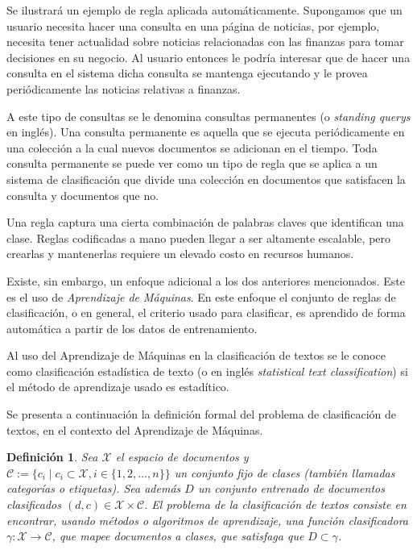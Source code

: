 \documentclass{llncs}
\newtheorem{mydef}{Definici\'on}
\begin{document}
	Se ilustrar\'a un ejemplo de regla aplicada autom\'aticamente. Supongamos que un usuario necesita hacer una consulta en una p\'agina de noticias, por ejemplo, necesita tener actualidad sobre noticias relacionadas con las finanzas para tomar decisiones en su negocio. Al usuario entonces le podr\'ia interesar que de hacer una consulta en el sistema dicha consulta se mantenga ejecutando y le provea peri\'odicamente las noticias relativas a finanzas. 
	
	A este tipo de consultas se le denomina consultas permanentes  (o \emph{standing querys} en ingl\'es). Una consulta permanente es aquella que se ejecuta peri\'odicamente en una colecci\'on a la cual nuevos  documentos se adicionan en el tiempo. Toda consulta permanente se puede ver como un tipo de regla que se aplica a un sistema de clasificaci\'on que divide una colecci\'on en documentos que satisfacen la consulta y documentos que no.
	
	
	
	Una regla captura una cierta combinaci\'on de palabras claves que identifican una clase. Reglas codificadas a mano pueden llegar a ser altamente escalable, pero crearlas y mantenerlas requiere un elevado costo en recursos humanos.
	
	Existe, sin embargo, un enfoque adicional a los dos anteriores mencionados. Este es el uso de \emph{Aprendizaje de M\'aquinas}. En este enfoque el conjunto de reglas de clasificaci\'on, o en general, el criterio usado para clasificar, es aprendido de forma autom\'atica a partir de los datos de entrenamiento.
	
	Al uso del Aprendizaje de M\'aquinas en la clasificaci\'on de textos se le conoce como clasificaci\'on estad\'istica de texto (o en ingl\'es \emph{statistical text classification}) si el m\'etodo de aprendizaje usado es estad\'itico.
	
	Se presenta a continuaci\'on la definici\'on formal del problema de clasificaci\'on de textos, en el contexto del Aprendizaje de M\'aquinas.
	
	\begin{mydef} \label{Problema_de_clasificacion}
		Sea $\mathcal{{X}}$ el espacio de documentos y $\mathcal{C} := \{c_i \mid c_i \subset \mathcal{X}, i \in \{ 1,2,\dots,n\} \}$ un conjunto fijo de clases (tambi\'en llamadas categor\'ias o etiquetas). Sea adem\'as $D$ un conjunto entrenado de documentos clasificados $(d,c) \in \mathcal X \times \mathcal{C}$. El \emph{problema de la clasificaci\'on de textos} consiste en encontrar, usando m\'etodos o algoritmos de aprendizaje, una funci\'on \emph{clasificadora} $\gamma : \mathcal{X} \rightarrow \mathcal{C}$, que mapee documentos a clases, que satisfaga que $D \subset \gamma$. 	

	\end{mydef}
	
\end{document}
